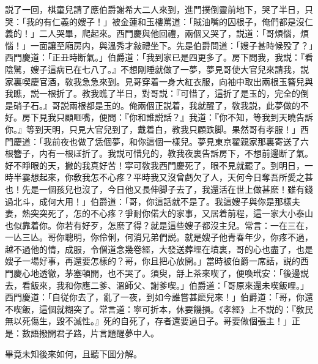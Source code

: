 説了一回，棋童兒請了應伯爵謝希大二人來到，進門撲倒靈前地下，哭了半日，只哭：「我的有仁義的嫂子！」被金蓮和玉樓罵道：「賊油嘴的囚根子，俺們都是沒仁義的！」二人哭畢，爬起來。西門慶與他回禮，兩個又哭了，説道：「哥煩惱，煩惱！」一面讓至廂房内，與溫秀才敍禮坐下。先是伯爵問道：「嫂子甚時候殁了？」西門慶道：「正丑時断氣。」伯爵道：「我到家已是四更多了。房下問我，我説：『看陰騭，嫂子這病已在七八了。』不想剛睡就做了一夢，夢見哥使大官兒來請我，説家裏喫慶官酒，敎我急急來到。見哥穿着一身大紅衣服，向袖中取出兩根玉簪兒與我瞧，説一根折了。教我瞧了半日，對哥説：『可惜了，這折了是玉的，完全的倒是硝子石。』哥説兩根都是玉的。俺兩個正説着，我就醒了，敎我説，此夢做的不好。房下見我只顧咂嘴，便問：『你和誰説話？』我道：『你不知，等我到天曉告訴你。』等到天明，只見大官兒到了，戴着白，教我只顧跌脚。果然哥有孝服！」西門慶道：「我前夜也做了恁個夢，和你這個一樣兒。夢見東京翟親家那裏寄送了六根簪子，内有一根ぼ折了。我説可惜兒的，教我夜裏告訴房下，不想前邊断了氣。好不睜眼的天，撇的我真好苦！寜可敎我西門慶死了，眼不見就罷了。到明日，一時半霎想起來，你敎我怎不心疼？平時我又沒曾虧欠了人，天何今日奪吾所愛之甚也！先是一個孩兒也沒了，今日他又長伸脚子去了，我還活在世上做甚麽！雖有錢過北斗，成何大用！」伯爵道：「哥，你這話就不是了。我這嫂子與你是那樣夫妻，熱突突死了，怎的不心疼？爭耐你偌大的家事，又居着前程，這一家大小泰山也似靠着你。你若有好歹，怎麽了得？就是這些嫂子都沒主兒。常言：一在三在，一亾三亾。哥你聰明，你伶俐，何消兄弟們説。就是嫂子他青春年少，你疼不過，越不過他的情，成服，令僧道念幾卷經，大發送葬埋在墳裏，哥的心也盡了，也是嫂子一場好事，再還要怎樣的？哥，你且把心放開。」當時被伯爵一席話，説的西門慶心地透徹，茅塞頓開，也不哭了。須臾，㧱上茶來喫了，便喚玳安：「後邊説去，看飯來，我和你應二爹、溫師父、謝爹喫。」伯爵道：「哥原來還未喫飯哩。」西門慶道：「自従你去了，亂了一夜，到如今誰嘗甚麽兒來！」伯爵道：「哥，你還不喫飯，這個就糊突了。常言道：寜可折本，休要饑損。《孝經》上不説的：『敎民無以死傷生，毀不滅性。』死的自死了，存者還要過日子。哥要做個張主！」正是：數語撥開君子路，片言題醒夢中人。

畢竟未知後來如何，且聽下囬分解。

